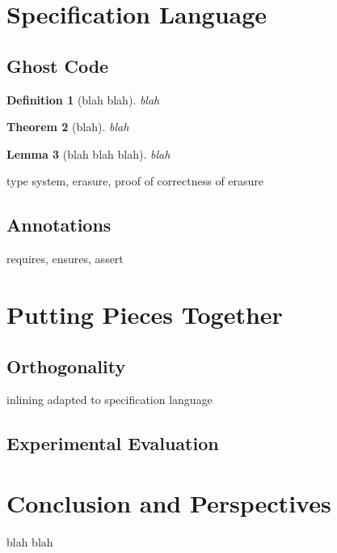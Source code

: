\documentclass[a4paper,11pt,oneside]{article}
\theoremstyle{plain}
\newtheorem{definition}{Definition}[subsection]
\newtheorem{lemma}[definition]{Lemma}
\newtheorem{theorem}[definition]{Theorem}
\begin{document}
\newpage
\section{Specification Language}

\subsection{Ghost Code}

\begin{definition}[blah blah] blah
\end{definition}

\begin{theorem}[blah] 
blah
\end{theorem}

\begin{lemma}[blah blah blah]
blah
\end{lemma}

type system, erasure, proof of correctness of erasure

\subsection{Annotations}

requires, ensures, assert

\section{Putting Pieces Together}

\subsection{Orthogonality}

inlining adapted to specification language

\subsection{Experimental Evaluation}

\section{Conclusion and Perspectives}

blah blah

\newpage
\end{document}
